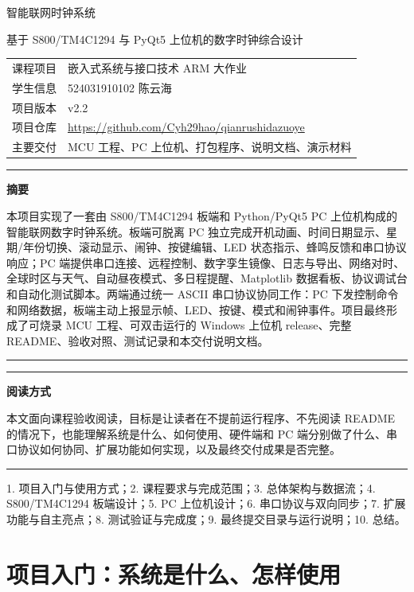 \documentclass[UTF8,zihao=-4,a4paper]{ctexart}
\newenvironment{infobox}[1]{%
  \par\vspace{0.28em}\noindent\begin{minipage}{0.96\linewidth}\color{Ink}\hrule\vspace{0.35em}
  \textbf{#1}\par\vspace{0.15em}
}{\vspace{0.28em}\hrule\end{minipage}\par\vspace{0.18em}}
\newenvironment{greenbox}[1]{%
  \par\vspace{0.28em}\noindent\begin{minipage}{0.96\linewidth}\color{Ink}\hrule\vspace{0.35em}
  \textbf{#1}\par\vspace{0.15em}
}{\vspace{0.28em}\hrule\end{minipage}\par\vspace{0.18em}}
\begin{document}
\begin{titlepage}
\centering
\vspace*{0.5cm}
{\heiti\color{TitleBlue} 智能联网时钟系统\par}
\vspace{0.42cm}
{\heiti 基于 S800/TM4C1294 与 PyQt5 上位机的数字时钟综合设计\par}
\vspace{0.65cm}
\begin{tabular}{rl}
课程项目 & 嵌入式系统与接口技术 ARM 大作业\\
学生信息 & 524031910102 \quad 陈云海\\
项目版本 & v2.2\\
项目仓库 & \url{https://github.com/Cyh29hao/qianrushidazuoye}\\
主要交付 & MCU 工程、PC 上位机、打包程序、说明文档、演示材料\\
\end{tabular}
\vspace{0.65cm}
\begin{infobox}{摘要}
本项目实现了一套由 S800/TM4C1294 板端和 Python/PyQt5 PC 上位机构成的智能联网数字时钟系统。板端可脱离 PC 独立完成开机动画、时间日期显示、星期/年份切换、滚动显示、闹钟、按键编辑、LED 状态指示、蜂鸣反馈和串口协议响应；PC 端提供串口连接、远程控制、数字孪生镜像、日志与导出、网络对时、全球时区与天气、自动昼夜模式、多日程提醒、Matplotlib 数据看板、协议调试台和自动化测试脚本。两端通过统一 ASCII 串口协议协同工作：PC 下发控制命令和网络数据，板端主动上报显示帧、LED、按键、模式和闹钟事件。项目最终形成了可烧录 MCU 工程、可双击运行的 Windows 上位机 release、完整 README、验收对照、测试记录和本交付说明文档。
\end{infobox}
\begin{greenbox}{阅读方式}
本文面向课程验收阅读，目标是让读者在不提前运行程序、不先阅读 README 的情况下，也能理解系统是什么、如何使用、硬件端和 PC 端分别做了什么、串口协议如何协同、扩展功能如何实现，以及最终交付成果是否完整。
\end{greenbox}
\vspace{0.28cm}
\par
\vspace{0.12cm}
{\small
1. 项目入门与使用方式；2. 课程要求与完成范围；3. 总体架构与数据流；4. S800/TM4C1294 板端设计；5. PC 上位机设计；6. 串口协议与双向同步；7. 扩展功能与自主亮点；8. 测试验证与完成度；9. 最终提交目录与运行说明；10. 总结。
}
\end{titlepage}

\section{项目入门：系统是什么、怎样使用}
\end{document}
